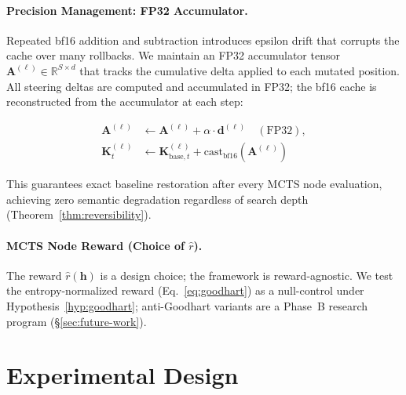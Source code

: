 \documentclass{article}
\begin{document}
\paragraph{Precision Management: FP32 Accumulator.} Repeated bf16 addition and subtraction introduces epsilon drift that corrupts the cache over many rollbacks. We maintain an FP32 accumulator tensor $\mathbf{A}^{(\ell)} \in \mathbb{R}^{S \times d}$ that tracks the cumulative delta applied to each mutated position. All steering deltas are computed and accumulated in FP32; the bf16 cache is reconstructed from the accumulator at each step:

\begin{equation}
\begin{aligned}
\mathbf{A}^{(\ell)} &\leftarrow \mathbf{A}^{(\ell)} + \alpha \cdot \mathbf{d}^{(\ell)} \quad (\text{FP32}), \\
\mathbf{K}_t^{(\ell)} &\leftarrow \mathbf{K}_{\text{base},t}^{(\ell)} + \text{cast}_{\text{bf16}}(\mathbf{A}^{(\ell)})
\end{aligned}
\label{eq:fp32_accumulator}
\end{equation}

This guarantees exact baseline restoration after every MCTS node evaluation, achieving zero semantic degradation regardless of search depth (Theorem~\ref{thm:reversibility}).

\paragraph{MCTS Node Reward (Choice of $\hat{r}$).}
The reward $\hat{r}(\mathbf{h})$ is a design choice; the framework is reward-agnostic. We test the entropy-normalized reward (Eq.~\ref{eq:goodhart}) as a null-control under Hypothesis~\ref{hyp:goodhart}; anti-Goodhart variants are a Phase~B research program (§\ref{sec:future-work}).

\section{Experimental Design}
\label{sec:experiments}
\end{document}
